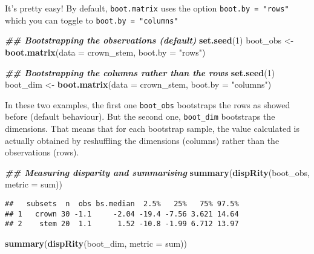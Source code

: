 \documentclass[
]{book}
\newenvironment{Shaded}{\begin{snugshade}}{\end{snugshade}}
\newcommand{\AttributeTok}[1]{\textcolor[rgb]{0.13,0.29,0.53}{#1}}
\newcommand{\DecValTok}[1]{\textcolor[rgb]{0.00,0.00,0.81}{#1}}
\newcommand{\DocumentationTok}[1]{\textcolor[rgb]{0.56,0.35,0.01}{\textbf{\textit{#1}}}}
\newcommand{\FunctionTok}[1]{\textcolor[rgb]{0.13,0.29,0.53}{\textbf{#1}}}
\newcommand{\NormalTok}[1]{#1}
\newcommand{\OtherTok}[1]{\textcolor[rgb]{0.56,0.35,0.01}{#1}}
\newcommand{\StringTok}[1]{\textcolor[rgb]{0.31,0.60,0.02}{#1}}
\begin{document}
It's pretty easy! By default, \texttt{boot.matrix} uses the option \texttt{boot.by\ =\ "rows"} which you can toggle to \texttt{boot.by\ =\ "columns"}

\begin{Shaded}
\begin{Highlighting}[]
\DocumentationTok{\#\# Bootstrapping the observations (default)}
\FunctionTok{set.seed}\NormalTok{(}\DecValTok{1}\NormalTok{)}
\NormalTok{boot\_obs }\OtherTok{\textless{}{-}} \FunctionTok{boot.matrix}\NormalTok{(}\AttributeTok{data =}\NormalTok{ crown\_stem, }\AttributeTok{boot.by =} \StringTok{"rows"}\NormalTok{)}

\DocumentationTok{\#\# Bootstrapping the columns rather than the rows}
\FunctionTok{set.seed}\NormalTok{(}\DecValTok{1}\NormalTok{)}
\NormalTok{boot\_dim }\OtherTok{\textless{}{-}} \FunctionTok{boot.matrix}\NormalTok{(}\AttributeTok{data =}\NormalTok{ crown\_stem, }\AttributeTok{boot.by =} \StringTok{"columns"}\NormalTok{)}
\end{Highlighting}
\end{Shaded}

In these two examples, the first one \texttt{boot\_obs} bootstraps the rows as showed before (default behaviour).
But the second one, \texttt{boot\_dim} bootstraps the dimensions.
That means that for each bootstrap sample, the value calculated is actually obtained by reshuffling the dimensions (columns) rather than the observations (rows).

\begin{Shaded}
\begin{Highlighting}[]
\DocumentationTok{\#\# Measuring disparity and summarising}
\FunctionTok{summary}\NormalTok{(}\FunctionTok{dispRity}\NormalTok{(boot\_obs, }\AttributeTok{metric =}\NormalTok{ sum))}
\end{Highlighting}
\end{Shaded}

\begin{verbatim}
##   subsets  n  obs bs.median  2.5%   25%   75% 97.5%
## 1   crown 30 -1.1     -2.04 -19.4 -7.56 3.621 14.64
## 2    stem 20  1.1      1.52 -10.8 -1.99 6.712 13.97
\end{verbatim}

\begin{Shaded}
\begin{Highlighting}[]
\FunctionTok{summary}\NormalTok{(}\FunctionTok{dispRity}\NormalTok{(boot\_dim, }\AttributeTok{metric =}\NormalTok{ sum))}
\end{Highlighting}
\end{Shaded}
\end{document}
